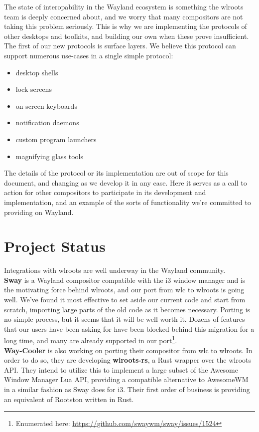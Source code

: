 \documentclass{article}
\begin{document}
The state of interopability in the Wayland ecosystem is something the wlroots
team is deeply concerned about, and we worry that many compositors are not
taking this problem seriously. This is why we are implementing the protocols of
other desktops and toolkits, and building our own when these prove insufficient.
The first of our new protocols is surface layers. We believe this protocol can
support numerous use-cases in a single simple protocol:

\begin{itemize}
    \item desktop shells
    \item lock screens
    \item on screen keyboards
    \item notification daemons
    \item custom program launchers
    \item magnifying glass tools
\end{itemize}

The details of the protocol or its implementation are out of scope for this
document, and changing as we develop it in any case. Here it serves as a call to
action for other compositors to participate in its development and
implementation, and an example of the sorts of functionality we're committed to
providing on Wayland.

\section{Project Status}

Integrations with wlroots are well underway in the Wayland community.\\

\textbf{Sway} is a Wayland compositor compatible with the i3 window manager and
is the motivating force behind wlroots, and our port from wlc to wlroots is
going well. We've found it most effective to set aside our current code and
start from scratch, importing large parts of the old code as it becomes
necessary. Porting is no simple process, but it seems that it will be well worth
it. Dozens of features that our users have been asking for have been blocked
behind this migration for a long time, and many are already supported in our
port\footnote{Enumerated here:
\url{https://github.com/swaywm/sway/issues/1524}}.\\

\textbf{Way-Cooler} is also working on porting their compositor from wlc to
wlroots. In order to do so, they are developing \textbf{wlroots-rs}, a Rust
wrapper over the wlroots API. They intend to utilize this to implement a large
subset of the Awesome Window Manager Lua API, providing a compatible alternative
to AwesomeWM in a similar fashion as Sway does for i3. Their first order of
business is providing an equivalent of Rootston written in Rust.\\
\end{document}
